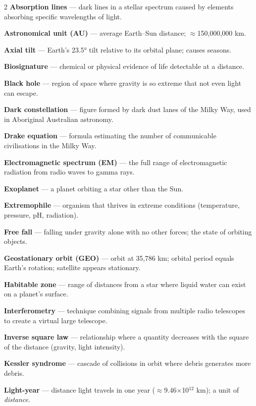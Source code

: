 \documentclass[11pt,a4paper]{article}
\begin{document}
\begin{multicols}{2}
\small
\textbf{Absorption lines} --- dark lines in a stellar spectrum caused by elements absorbing specific wavelengths of light.

\textbf{Astronomical unit (AU)} --- average Earth--Sun distance; $\approx$150,000,000 km.

\textbf{Axial tilt} --- Earth's 23.5° tilt relative to its orbital plane; causes seasons.

\textbf{Biosignature} --- chemical or physical evidence of life detectable at a distance.

\textbf{Black hole} --- region of space where gravity is so extreme that not even light can escape.

\textbf{Dark constellation} --- figure formed by dark dust lanes of the Milky Way, used in Aboriginal Australian astronomy.

\textbf{Drake equation} --- formula estimating the number of communicable civilisations in the Milky Way.

\textbf{Electromagnetic spectrum (EM)} --- the full range of electromagnetic radiation from radio waves to gamma rays.

\textbf{Exoplanet} --- a planet orbiting a star other than the Sun.

\textbf{Extremophile} --- organism that thrives in extreme conditions (temperature, pressure, pH, radiation).

\textbf{Free fall} --- falling under gravity alone with no other forces; the state of orbiting objects.

\textbf{Geostationary orbit (GEO)} --- orbit at 35,786 km; orbital period equals Earth's rotation; satellite appears stationary.

\textbf{Habitable zone} --- range of distances from a star where liquid water can exist on a planet's surface.

\textbf{Interferometry} --- technique combining signals from multiple radio telescopes to create a virtual large telescope.

\textbf{Inverse square law} --- relationship where a quantity decreases with the square of the distance (gravity, light intensity).

\textbf{Kessler syndrome} --- cascade of collisions in orbit where debris generates more debris.

\textbf{Light-year} --- distance light travels in one year ($\approx$9.46$\times$10$^{12}$ km); a unit of \textit{distance}.


\end{multicols}
\end{document}
